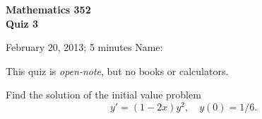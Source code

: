 \documentclass[11pt]{exam}
\begin{document}
\noindent
\textbf{{\large Mathematics 352 \\ Quiz 3}}

\noindent
February 20, 2013; 5 minutes  \hfill Name: \underline{\hspace{3in}} 

\noindent
This quiz is \emph{open-note}, but no books or calculators.

\begin{questions}  

\question Find the solution of the initial value problem
\[
    y' = (1 - 2x)y^2, \quad y(0) = 1/6.
\]


\end{questions}
\end{document}
